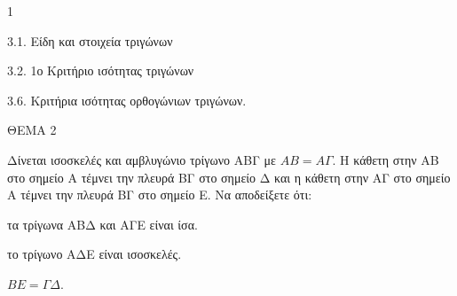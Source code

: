 \begin{ylh}{1}
    \item 3.1. Είδη και στοιχεία τριγώνων
    \item 3.2. 1ο Κριτήριο ισότητας τριγώνων
    \item 3.6. Κριτήρια ισότητας ορθογώνιων τριγώνων.
\end{ylh}

ΘΕΜΑ 2

Δίνεται ισοσκελές και αμβλυγώνιο τρίγωνο ΑΒΓ με $ΑΒ = Α\Gamma$. Η κάθετη στην ΑΒ στο σημείο Α τέμνει την πλευρά ΒΓ στο σημείο Δ και η κάθετη στην ΑΓ στο σημείο Α τέμνει την πλευρά ΒΓ στο σημείο Ε. Να αποδείξετε ότι:

\begin{alist}
\item τα τρίγωνα ΑΒΔ και ΑΓΕ είναι ίσα. 

\item το τρίγωνο ΑΔΕ είναι ισοσκελές. 

\item $ΒΕ = \Gamma\Delta$. 


\begin{center}
\end{center}
\end{alist}
